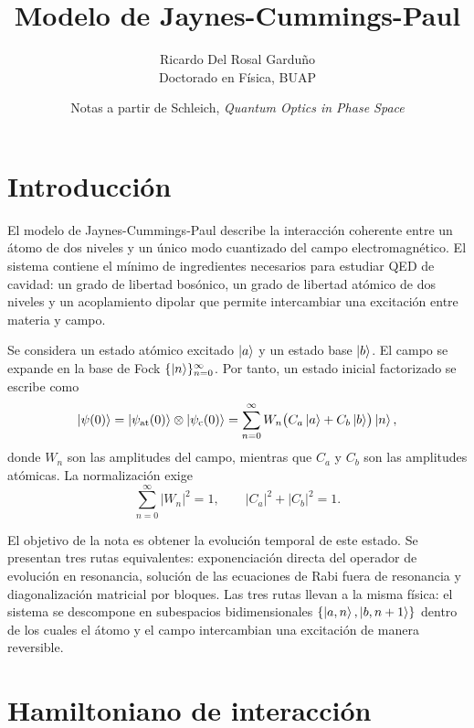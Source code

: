\documentclass[11pt]{article}
\title{Modelo de Jaynes-Cummings-Paul}
\author{Ricardo Del Rosal Gardu\~no \\ \small Doctorado en F\'isica, BUAP}
\date{Notas a partir de Schleich, \emph{Quantum Optics in Phase Space}}
\begin{document}
\maketitle

\tableofcontents
\bigskip

\section{Introducci\'on}

El modelo de Jaynes-Cummings-Paul describe la interacci\'on coherente entre un
\'atomo de dos niveles y un \'unico modo cuantizado del campo electromagn\'etico.
El sistema contiene el m\'inimo de ingredientes necesarios para estudiar QED de
cavidad: un grado de libertad bos\'onico, un grado de libertad at\'omico de dos
niveles y un acoplamiento dipolar que permite intercambiar una excitaci\'on entre
materia y campo.

Se considera un estado at\'omico excitado $\ket{a}$ y un estado base $\ket{b}$.
El campo se expande en la base de Fock $\{\ket{n}\}_{n=0}^{\infty}$. Por tanto,
un estado inicial factorizado se escribe como
\begin{equation}
  \ket{\psi(0)}
  =
  \ket{\psi_{\mathrm{at}}(0)}\otimes\ket{\psi_{\mathrm{c}}(0)}
  =
  \sum_{n=0}^{\infty} W_n
  \bigl(C_a\ket{a}+C_b\ket{b}\bigr)\ket{n},
\end{equation}
donde $W_n$ son las amplitudes del campo, mientras que $C_a$ y $C_b$ son las
amplitudes at\'omicas. La normalizaci\'on exige
\begin{equation}
  \sum_{n=0}^{\infty}|W_n|^2=1,
  \qquad
  |C_a|^2+|C_b|^2=1.
\end{equation}

El objetivo de la nota es obtener la evoluci\'on temporal de este estado. Se
presentan tres rutas equivalentes: exponenciaci\'on directa del operador de
evoluci\'on en resonancia, soluci\'on de las ecuaciones de Rabi fuera de
resonancia y diagonalizaci\'on matricial por bloques. Las tres rutas llevan a la
misma f\'isica: el sistema se descompone en subespacios bidimensionales
$\{\ket{a,n},\ket{b,n+1}\}$ dentro de los cuales el \'atomo y el campo
intercambian una excitaci\'on de manera reversible.

\section{Hamiltoniano de interacci\'on}
\end{document}
